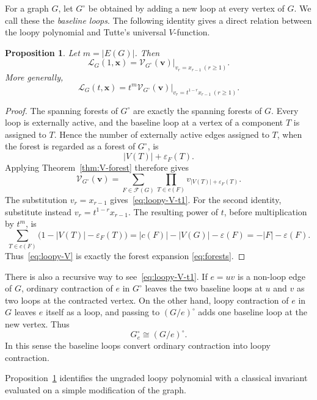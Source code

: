 \documentclass[11pt]{article}
\theoremstyle{plain}
\newtheorem{proposition}[theorem]{Proposition}
\theoremstyle{definition}
\renewcommand{\mathcal}{\mathscr}
\newcommand{\LL}{\mathcal{L}}    %
\newcommand{\cF}{\mathcal{F}}    %
\newcommand{\cV}{\mathcal{V}}    %
\newcommand{\bv}{\mathbf{v}}
\newcommand{\bx}{\mathbf{x}}
\newcommand{\eps}{\varepsilon}
\numberwithin{equation}{section}
\begin{document}
For a graph $G$, let $G^\circ$ be obtained by adding a new loop at every
vertex of $G$.  We call these the \emph{baseline loops}.  The following
identity gives a direct relation between the loopy polynomial and Tutte's
universal $V$-function.

\begin{proposition}\label{prop:loopy-V}
Let $m=|E(G)|$.  Then
\begin{equation}\label{eq:loopy-V-t1}
   \LL_G(1,\bx)
   =
   \left.
      \cV_{G^\circ}(\bv)
   \right|_{v_r=x_{r-1}\ (r\ge 1)}.
\end{equation}
More generally,
\begin{equation}\label{eq:loopy-V}
   \LL_G(t,\bx)
   =
   t^m
   \left.
      \cV_{G^\circ}(\bv)
   \right|_{v_r=t^{1-r}x_{r-1}\ (r\ge 1)}.
\end{equation}
\end{proposition}

\begin{proof}
The spanning forests of $G^\circ$ are exactly the spanning forests of $G$.
Every loop is externally active, and the baseline loop at a vertex of
a component $T$ is assigned to $T$.  Hence the number of externally active
edges assigned to $T$, when the forest is regarded as a forest of $G^\circ$, is
\[
   |V(T)|+\eps_F(T).
\]
Applying Theorem~\ref{thm:V-forest} therefore gives
\[
   \cV_{G^\circ}(\bv)
   =
   \sum_{F\in\cF(G)}
   \prod_{T\in c(F)}
   v_{|V(T)|+\eps_F(T)}.
\]
The substitution $v_r=x_{r-1}$ gives~\eqref{eq:loopy-V-t1}.
For the second identity, substitute instead
$v_r=t^{1-r}x_{r-1}$.  The resulting power of
$t$, before multiplication by $t^m$, is
\[
   \sum_{T\in c(F)}
      \bigl(1-|V(T)|-\eps_F(T)\bigr)
   =|c(F)|-|V(G)|-\eps(F)
   =-|F|-\eps(F).
\]
Thus~\eqref{eq:loopy-V} is exactly the forest expansion
\eqref{eq:forests}.
\end{proof}

There is also a recursive way to see~\eqref{eq:loopy-V-t1}.  If $e=uv$ is
a non-loop edge of $G$, ordinary contraction of $e$ in $G^\circ$ leaves the
two baseline loops at $u$ and $v$ as two loops at the contracted vertex.  On
the other hand, loopy contraction of $e$ in $G$ leaves $e$ itself as a loop,
and passing to $(G/e)^\circ$ adds one baseline loop at the new vertex.  Thus
\[
   G^\circ_e\cong (G/e)^\circ.
\]
In this sense the baseline loops convert ordinary contraction into loopy contraction.

Proposition~\ref{prop:loopy-V} identifies the ungraded loopy polynomial with a classical invariant evaluated on a simple modification of the graph.
\end{document}
